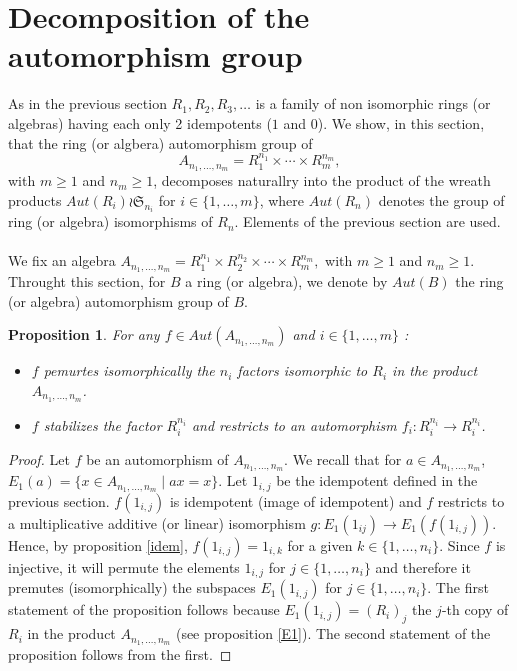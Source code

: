 \documentclass[12pt, reqno]{amsart}
\newtheorem{proposition}[theorem]{Proposition}
\begin{document}
\section{Decomposition of the automorphism group}\label{s2}
As in the previous section $R_1,R_2,R_3,\dots$ is a family of non isomorphic rings (or algebras) having each only 2 idempotents ($1$ and $0$). We show, in this section, that the ring (or algbera) automorphism group of $$A_{n_1,\dots,n_m}=R_1^{n_1}\times \cdots \times R_m^{n_m},$$ with $m\geq 1$ and $n_m \geq 1$, decomposes naturallry  into the product of the wreath products $Aut( R_i)\wr \mathfrak{S}_{n_i} $ for $i\in \{1,\dots,m\}$, where $Aut(R_n)$ denotes the group of ring (or algebra) isomorphisms of $R_n$.  Elements of the previous section are used.\\\\
 We fix an algebra $A_{n_1,\dots,n_m}=R_1^{n_1}\times R_2^{n_2}\times \cdots \times R_m^{n_m},$ with $m\geq 1$ and $n_m \geq 1$. Throught this section, for $B$ a ring (or algebra), we denote by $Aut(B)$ the ring (or algebra) automorphism group of $B$.  

\begin{proposition}\label{per}
For any $ f\in Aut(A_{n_1,\dots,n_m})$ and $i\in\{1,\dots,m\}$ : 
\begin{itemize}
\item[1)] $f$ pemurtes isomorphically the $n_i$ factors isomorphic to $R_i$ in the product $A_{n_1,\dots,n_m}$.
\item[2)] $f$ stabilizes the factor $R_i^{n_i}$ and restricts to an automorphism $f_i :  R_i^{n_i}\to  R_i^{n_i} $.
\end{itemize}
\end{proposition}
\begin{proof}
Let $f$ be an automorphism of $A_{n_1,\dots,n_m}$. We recall that for $a\in  A_{n_1,\dots,n_m}$,  $E_1(a)=\{x \in A_{n_1,\dots,n_m} \mid ax=x \}$.  Let $1_{i,j}$ be the idempotent defined in the previous section. $f(1_{i,j})$ is idempotent (image of idempotent) and $f$ restricts to a multiplicative additive (or linear) isomorphism $g: E_1(1_{ij})\to E_1(f(1_{i,j}))$. Hence, by proposition \ref{idem}, $f(1_{i,j})=1_{i,k}$ for a given $k\in\{1,\dots,n_i\}$. Since $f$ is injective, it will permute the elements $1_{i,j}$ for $j\in\{1,\dots,n_i\}$  and therefore it premutes (isomorphically) the subspaces $E_1(1_{i,j})$ for $j\in\{1,\dots,n_i\}$. The first statement of the proposition follows because $E_1(1_{i,j})=(R_i)_j$ the $j$-th copy of $R_i$ in the product $A_{n_1,\dots,n_m}$ (see proposition \ref{E1}). The second statement of the proposition follows from the first. 
\end{proof}
\end{document}
